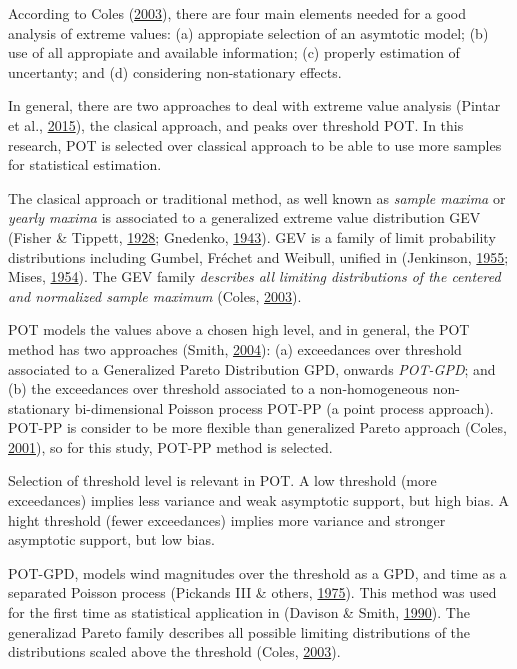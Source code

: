 \documentclass[12pt,oneside]{reedthesis}
\begin{document}
According to Coles (\protect\hyperlink{ref-Coles2003}{2003}), there are four main elements needed for a good analysis of extreme values: (a) appropiate selection of an asymtotic model; (b) use of all appropiate and available information; (c) properly estimation of uncertanty; and (d) considering non-stationary effects.

In general, there are two approaches to deal with extreme value analysis (Pintar et al., \protect\hyperlink{ref-Pintar2015}{2015}), the clasical approach, and peaks over threshold POT. In this research, POT is selected over classical approach to be able to use more samples for statistical estimation.

The clasical approach or traditional method, as well known as \emph{sample maxima} or \emph{yearly maxima} is associated to a generalized extreme value distribution GEV (Fisher \& Tippett, \protect\hyperlink{ref-Fisher1928}{1928}; Gnedenko, \protect\hyperlink{ref-Gnedenko1943}{1943}). GEV is a family of limit probability distributions including Gumbel, Fréchet and Weibull, unified in (Jenkinson, \protect\hyperlink{ref-Jenkinson1955}{1955}; Mises, \protect\hyperlink{ref-Mises1954}{1954}). The GEV family \emph{describes all limiting distributions of the centered and normalized sample maximum} (Coles, \protect\hyperlink{ref-Coles2003}{2003}).

POT models the values above a chosen high level, and in general, the POT method has two approaches (Smith, \protect\hyperlink{ref-Smith2004}{2004}): (a) exceedances over threshold associated to a Generalized Pareto Distribution GPD, onwards \emph{POT-GPD}; and (b) the exceedances over threshold associated to a non-homogeneous non-stationary bi-dimensional Poisson process POT-PP (a point process approach). POT-PP is consider to be more flexible than generalized Pareto approach (Coles, \protect\hyperlink{ref-Coles2001}{2001}), so for this study, POT-PP method is selected.

Selection of threshold level is relevant in POT. A low threshold (more exceedances) implies less variance and weak asymptotic support, but high bias. A hight threshold (fewer exceedances) implies more variance and stronger asymptotic support, but low bias.

POT-GPD, models wind magnitudes over the threshold as a GPD, and time as a separated Poisson process (Pickands III \& others, \protect\hyperlink{ref-PickandsIII1975}{1975}). This method was used for the first time as statistical application in (Davison \& Smith, \protect\hyperlink{ref-Davison1990}{1990}). The generalizad Pareto family describes all possible limiting distributions of the distributions scaled above the threshold (Coles, \protect\hyperlink{ref-Coles2003}{2003}).
\end{document}
